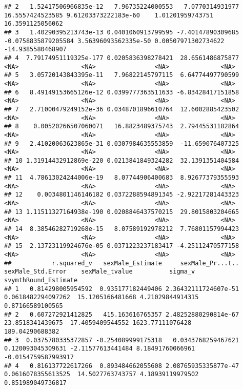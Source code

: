 \documentclass[
]{book}
\begin{document}
\begin{verbatim}
## 2   1.52417506966835e-12   7.96735224000553   7.0770314931977    16.5557424523585 9.61203373222183e-60    1.01201959743751  16.3591125056062
## 3   1.40290395213743e-13 0.0401060913799595 -7.40147890309685 -0.0758835879205584 3.56396093562335e-50 0.00507971302734622 -14.9385580468907
## 4  7.79174951119325e-177 0.0205836398278421  28.6561486875877                <NA>                 <NA>                <NA>              <NA>
## 5   3.05720143843395e-11   7.96822145797115  6.64774497790599                <NA>                 <NA>                <NA>              <NA>
## 6   8.49149153665126e-12 0.0399777363511633 -6.83428417151858                <NA>                 <NA>                <NA>              <NA>
## 7   2.71000479249152e-36 0.0348701896610764  12.6002885423502                <NA>                 <NA>                <NA>              <NA>
## 8    0.00520266507060071   16.8823489375743  2.79445531182864                <NA>                 <NA>                <NA>              <NA>
## 9   2.41020063623865e-31 0.0307984635553859  -11.659076407325                <NA>                 <NA>                <NA>              <NA>
## 10 1.31914432912869e-220 0.0213841849324282  32.1391351404584                <NA>                 <NA>                <NA>              <NA>
## 11  4.78613024244006e-19   8.07744906400683  8.92677379355593                <NA>                 <NA>                <NA>              <NA>
## 12    0.0034801146146182 0.0372288594891345 -2.92217281443323                <NA>                 <NA>                <NA>              <NA>
## 13 1.11511327164938e-190 0.0208846437570215  29.8015803204665                <NA>                 <NA>                <NA>              <NA>
## 14  8.38546282719268e-15   8.07589192978212  7.76801157994423                <NA>                 <NA>                <NA>              <NA>
## 15  2.13723119924676e-05 0.0371223237183417 -4.25112470577158                <NA>                 <NA>                <NA>              <NA>
##           r.squared_v   sexMale_Estimate     sexMale_Pr...t..  sexMale_Std.Error    sexMale_tvalue          sigma_v svymthRound_Estimate
## 1   0.814298005954592  0.935177182449406 2.36432111724607e-51 0.0618482294097262  15.1205166481668 4.21029844914315     0.87166589100565
## 2   0.607272921412825   415.163616765357 2.48252880290814e-67   23.8518341439675  17.4059409544552 1623.77111076428      189.04290688382
## 3  0.0375780335372857 -0.254089999175318   0.0343768259467621  0.120093045309631 -2.11577613441484 8.18491760066961  -0.0154759587993917
## 4   0.816137722617266  0.893484662055608 2.08765935335877e-47 0.0616078355613525  14.5027763743757 4.18939119979502    0.851989049736817

\end{verbatim}
\end{document}
